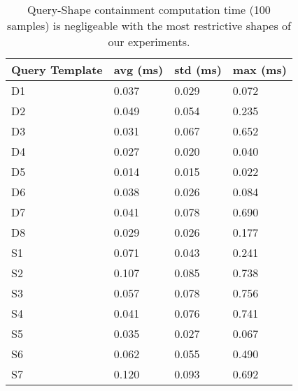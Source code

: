 \begin{table}
	\begin{center}
		\begin{tabular}{|l|l|l|l|}
			\hline
			Query Template & avg (ms) & std (ms) & max (ms) \\
			\hline
			D1 & 0.037 & 0.029 & 0.072 \\
			\hline
			D2 & 0.049 & 0.054 & 0.235 \\
			\hline
			D3 & 0.031 & 0.067 & 0.652 \\
			\hline
			D4 & 0.027 & 0.020 & 0.040 \\
			\hline
			D5 & 0.014 & 0.015 & 0.022 \\
			\hline
			D6 & 0.038 & 0.026 & 0.084 \\
			\hline
			D7 & 0.041 & 0.078 & 0.690 \\
			\hline
			D8 & 0.029 & 0.026 & 0.177 \\
			\hline
			S1 & 0.071 & 0.043 & 0.241 \\
			\hline
			S2 & 0.107 & 0.085 & 0.738 \\
			\hline
			S3 & 0.057 & 0.078 & 0.756 \\
			\hline
			S4 & 0.041 & 0.076 & 0.741 \\
			\hline
			S5 & 0.035 & 0.027 & 0.067 \\
			\hline
			S6 & 0.062 & 0.055 & 0.490 \\
			\hline
			S7 & 0.120 & 0.093 & 0.692 \\
			\hline
		\end{tabular}
	\end{center}
	\caption{Query-Shape containment computation time (100 samples) is negligeable with the most restrictive shapes of our experiments.}
	\label{tab:queryShapeContainmentEval}
\end{table}